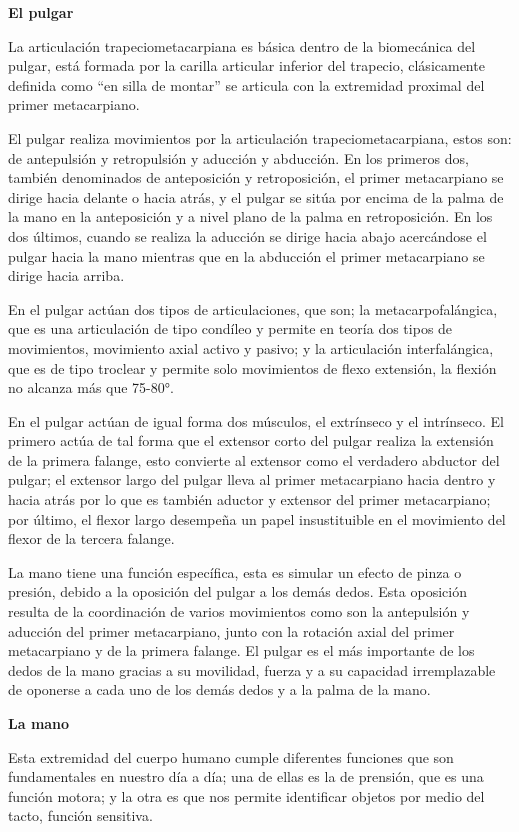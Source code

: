 \documentclass{article}
\begin{document}
\textbf{El pulgar }

La articulación trapeciometacarpiana es básica dentro de la biomecánica del pulgar, está formada por la carilla articular inferior del trapecio, clásicamente definida como “en silla de montar” se articula con la extremidad proximal del primer metacarpiano. 

El pulgar realiza movimientos por la articulación trapeciometacarpiana, estos son: de antepulsión y retropulsión y aducción y abducción. En los primeros dos, también denominados de anteposición y retroposición, el primer metacarpiano se dirige hacia delante o hacia atrás, y el pulgar se sitúa por encima de la palma de la mano en la anteposición y a nivel plano de la palma en retroposición. En los dos últimos, cuando se realiza la aducción se dirige hacia abajo acercándose el pulgar hacia la mano mientras que en la abducción el primer metacarpiano se dirige hacia arriba. 

En el pulgar actúan dos tipos de articulaciones, que son; la metacarpofalángica, que es una articulación de tipo condíleo y permite en teoría dos tipos de movimientos, movimiento axial activo y pasivo; y la articulación interfalángica, que es de tipo troclear y permite solo movimientos de flexo extensión, la flexión no alcanza más que 75-80°.

En el pulgar actúan de igual forma dos músculos, el extrínseco y el intrínseco. El primero actúa de tal forma que el extensor corto del pulgar realiza la extensión de la primera falange, esto convierte al extensor como el verdadero abductor del pulgar; el extensor largo del pulgar lleva al primer metacarpiano hacia dentro y hacia atrás por lo que es también aductor y extensor del primer metacarpiano; por último, el flexor largo desempeña un papel insustituible en el movimiento del flexor de la tercera falange.

La mano tiene una función específica, esta es simular un efecto de pinza o presión, debido a la oposición del pulgar a los demás dedos. Esta oposición resulta de la coordinación de varios movimientos como son la antepulsión y aducción del primer metacarpiano, junto con la rotación axial del primer metacarpiano  y de la primera falange. El pulgar es el más importante de los dedos de la mano gracias a su movilidad, fuerza y a su capacidad irremplazable de oponerse a cada uno de los demás dedos y a la palma de la mano. 

\textbf{La mano} 

Esta extremidad del cuerpo humano cumple diferentes funciones que son fundamentales en nuestro día a día; una de ellas es la de prensión, que es una función motora; y la otra es que nos permite identificar objetos por medio del tacto, función sensitiva.
\end{document}
